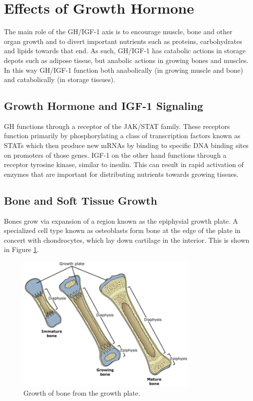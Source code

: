 \documentclass{tufte-handout}
\begin{document}
\section{Effects of Growth Hormone}

The main role of the GH/IGF-1 axis is to encourage muscle, bone and other organ growth and to divert important nutrients such as proteins, carbohydrates and lipids towards that end.  As such, GH/IGF-1 has catabolic actions in storage depots such as adipose tissue, but anabolic actions in growing bones and muscles.  In this way GH/IGF-1 function both anabolically (in growing muscle and bone) and catabolically (in storage tissues).

\subsection{Growth Hormone and IGF-1 Signaling}

GH functions through a receptor of the JAK/STAT family.  These receptors function primarily by phosphorylating a class of transcription factors known as STATs which then produce new mRNAs by binding to specific DNA binding sites on promoters of those genes.  IGF-1 on the other hand functions through a receptor tyrosine kinase, similar to insulin.  This can result in rapid activation of enzymes that are important for distributing nutrients towards growing tissues.

\subsection{Bone and Soft Tissue Growth}

Bones grow via expansion of a region known as the epiphysial growth plate.  A specialized cell type known as osteoblasts form bone at the edge of the plate in concert with chondrocytes, which lay down cartilage in the interior.  This is shown in Figure \ref{fig:bone-growth}.

\begin{figure}
\centering
  \includegraphics[width=0.8\textwidth]{figures/bone-growth}
  \caption{Growth of bone from the growth plate.}
    \label{fig:bone-growth}
\end{figure}
\end{document}

